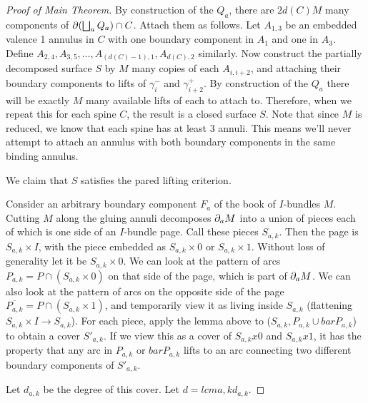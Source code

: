 \begin{proof}[Proof of Main Theorem]
By construction of the $Q_a$, there are $2d(C)M$ many components of
$\partial(\bigsqcup_a Q_a) \cap C$. Attach them as follows. Let $A_{1,3}$ be an
embedded valence 1 annulus in $C$ with one boundary component in $A_1$ and one
in $A_3$. Define $A_{2,4},A_{3,5},\dots,A_{(d(C)-1),1},A_{d(C),2}$ similarly.
Now construct the partially decomposed surface $S$ by $M$ many copies of each
$A_{i,i+2}$, and attaching their boundary components to lifts of $\gamma_i^-$
and $\gamma_{i+2}^+$. By construction of the $Q_a$ there will be exactly $M$
many available lifts of each to attach to. Therefore, when we repeat this for
each spine $C$, the result is a closed surface $S$. Note that since $M$ is
reduced, we know that each spine has at least 3 annuli. This means we'll never
attempt to attach an annulus with both boundary components in the same binding
annulus.

We claim that $S$ satisfies the pared lifting criterion.




Consider an arbitrary boundary component $F_a$ of the book of $I$-bundles $M$.
Cutting $M$ along the gluing annuli decomposes $\partial_aM$ into a union of pieces
each of which is one side of an $I$-bundle page. Call these pieces $S_{a,k}$.
Then the page is $S_{a,k}\times I$, with the piece embedded as $S_{a,k}\times
0$ or $S_{a,k}\times 1$. Without loss of generality let it be $S_{a,k}\times
0$. We can look at the pattern of arcs $P_{a,k} = P \cap (S_{a,k}\times 0)$ on
that side of the page, which is part of $\partial_aM$. We can also look at the
pattern of arcs on the opposite side of the page $\overline{P_{a,k}} = P \cap
(S_{a,k}\times 1)$, and temporarily view it as living inside $S_{a,k}$
(flattening $S_{a,k}\times I \to S_{a,k}$).  For each piece, apply the lemma
above to ($S_{a,k},P_{a,k} \cup barP_{a,k}$) to obtain a cover $S'_{a,k}$. If
we view this as a cover of $S_{a,k}x0$ and $S_{a,k}x1$, it has the property
that any arc in $P_{a,k}$ or $barP_{a,k}$ lifts to an arc connecting two
different boundary components of $S'_{a,k}$.

Let $d_{a,k}$ be the degree of this cover. Let $d = lcm a,k d_{a,k}$.


\end{proof}
